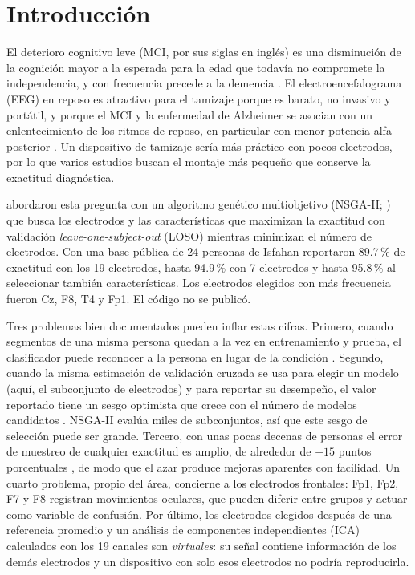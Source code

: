 \section{Introducción}

El deterioro cognitivo leve (MCI, por sus siglas en inglés) es una disminución de la cognición mayor a la esperada para la edad que todavía no compromete la independencia, y con frecuencia precede a la demencia \citep{petersen2004}. El electroencefalograma (EEG) en reposo es atractivo para el tamizaje porque es barato, no invasivo y portátil, y porque el MCI y la enfermedad de Alzheimer se asocian con un enlentecimiento de los ritmos de reposo, en particular con menor potencia alfa posterior \citep{babiloni2015,cassani2018}. Un dispositivo de tamizaje sería más práctico con pocos electrodos, por lo que varios estudios buscan el montaje más pequeño que conserve la exactitud diagnóstica.

\citet{aljalal2024} abordaron esta pregunta con un algoritmo genético multiobjetivo (NSGA-II; \citealp{deb2002}) que busca los electrodos y las características que maximizan la exactitud con validación \emph{leave-one-subject-out} (LOSO) mientras minimizan el número de electrodos. Con una base pública de 24 personas de Isfahan \citep{kashefpoor2016} reportaron 89.7\,\% de exactitud con los 19 electrodos, hasta 94.9\,\% con 7 electrodos y hasta 95.8\,\% al seleccionar también características. Los electrodos elegidos con más frecuencia fueron Cz, F8, T4 y Fp1. El código no se publicó.

Tres problemas bien documentados pueden inflar estas cifras. Primero, cuando segmentos de una misma persona quedan a la vez en entrenamiento y prueba, el clasificador puede reconocer a la persona en lugar de la condición \citep{saeb2017}. Segundo, cuando la misma estimación de validación cruzada se usa para elegir un modelo (aquí, el subconjunto de electrodos) y para reportar su desempeño, el valor reportado tiene un sesgo optimista que crece con el número de modelos candidatos \citep{varma2006,cawley2010}. NSGA-II evalúa miles de subconjuntos, así que este sesgo de selección puede ser grande. Tercero, con unas pocas decenas de personas el error de muestreo de cualquier exactitud es amplio, de alrededor de $\pm 15$ puntos porcentuales \citep{varoquaux2018}, de modo que el azar produce mejoras aparentes con facilidad. Un cuarto problema, propio del área, concierne a los electrodos frontales: Fp1, Fp2, F7 y F8 registran movimientos oculares, que pueden diferir entre grupos y actuar como variable de confusión. Por último, los electrodos elegidos después de una referencia promedio y un análisis de componentes independientes (ICA) calculados con los 19 canales son \emph{virtuales}: su señal contiene información de los demás electrodos y un dispositivo con solo esos electrodos no podría reproducirla.

